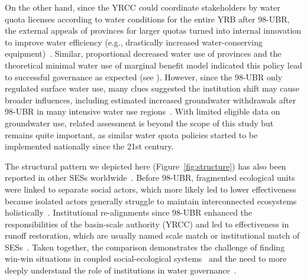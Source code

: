 On the other hand, since the YRCC could coordinate stakeholders by water quota licenses according to water conditions for the entire YRB after 98-UBR, the external appeals of provinces for larger quotas turned into internal innovation to improve water efficiency (e.g., drastically increased water-conserving equipment)~\cite{krieger1955, ostrom1990}.
Similar, proportional decreased water use of provinces and the theoretical minimal water use of marginal benefit model indicated this policy lead to successful governance as expected (see ).
However, since the 98-UBR only regulated surface water use, many clues suggested the institution shift may cause broader influences, including estimated increased groundwater withdrawals after 98-UBR in many intensive water use regions~\cite{sun2022b}.
With limited eligible data on groundwater use, related assessment is beyond the scope of this study but remains quite important, as similar water quota policies started to be implemented nationally since the 21st century.

The structural pattern we depicted here (Figure~\ref{fig:structure}) has also been reported in other SESs worldwide~\cite{kluger2020,guerrero2015,bodin2012}.
Before 98-UBR, fragmented ecological units were linked to separate social actors, which more likely led to lower effectiveness because isolated actors generally struggle to maintain interconnected ecosystems holistically~\cite{sayles2017,sayles2019,cai2016,bergsten2019}.
Institutional re-alignments since 98-UBR enhanced the responsibilities of the basin-scale authority (YRCC) and led to effectiveness in runoff restoration, which are usually named scale match or institutional match of SESs~\cite{cumming2020a,wang2019d}.
Taken together, the comparison demonstrates the challenge of finding win-win situations in coupled social-ecological systems~\cite{hegwood2022} and the need to more deeply understand the role of institutions in water governance~\cite{bergsten2019, sayles2019}.


